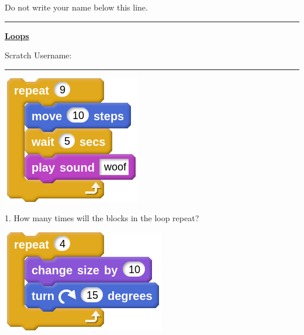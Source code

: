 \documentclass[letterpaper,12pt]{article}
\newcommand\numbox{%
    \fbox{\rule{1in}{0pt}\rule[-1ex]{0pt}{5ex}}}
\begin{document}
\noindent Do not write your name below this line. \\
\noindent \hrule
\begin{center}
{\Large \textbf{\underline{Loops}}} \\
\end{center}
Scratch Username: \rule{4cm}{0.4pt}

\noindent \dotfill


\begin{center}
\includegraphics[scale=.4]{q1_script0.png}
\end{center}
1. How many times will the blocks in the loop repeat?
\numbox \\

\noindent \dotfill
\begin{center}
\includegraphics[scale=.4]{q2_script0.png}
\end{center}
\end{document}
